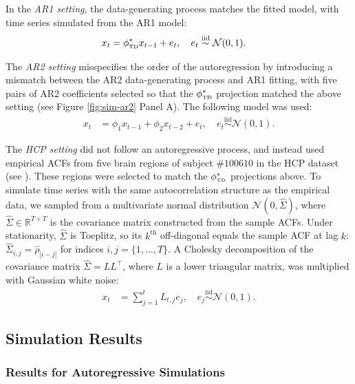 \documentclass[docs/main.tex]{subfiles}
\begin{document}
In the \textit{AR1 setting}, the data-generating process matches the fitted model, with time series simulated from the AR1 model:
\begin{align}\label{eq:sim-td-ar1}
    x_t &= \phi_{\scriptscriptstyle\text{TD}}^* x_{t-1} + e_t, \quad e_t \overset{\text{iid}}{\sim} \mathcal{N}(0, 1).
\end{align}

The \textit{AR2 setting} misspecifies the order of the autoregression by introducing a mismatch between the AR2 data-generating process and AR1 fitting,  with five pairs of AR2 coefficients selected so that the $\phi_{\scriptscriptstyle\text{TD}}^*$ projection matched the above setting (see Figure \ref{fig:sim-ar2} Panel A). The following model was used:
\begin{align}\label{eq:sim-td-ar2}
    x_t &= \phi_1 x_{t-1} + \phi_2 x_{t-2} + e_t, \quad e_t \overset{\text{iid}}{\sim} \mathcal{N}(0, 1).
\end{align}

The \textit{HCP setting} did not follow an autoregressive process, and instead used empirical ACFs from five brain regions of subject $\#100610$ in the HCP dataset (see ). These regions were selected to match the $\phi_{\scriptscriptstyle\text{TD}}^*$ projections above. To simulate time series with the same autocorrelation structure as the empirical data, we sampled from a multivariate normal distribution $\mathcal{N}(0, \hat\Sigma)$, where $\hat\Sigma \in \mathbb{R}^{T\times T}$ is the covariance matrix constructed from the sample ACFs. Under stationarity, $\hat\Sigma$ is Toeplitz, so its $k^\text{th}$ off-diagonal equals the sample ACF at lag $k$: $\hat\Sigma_{i,j} = \hat\rho_{|i-j|}$ for indices $i,j=\{1, \dots, T\}$. A Cholesky decomposition of the covariance matrix $\hat\Sigma = LL^{\top}$, where $L$ is a lower triangular matrix, was multiplied with Gaussian white noise:
\begin{align}\label{eq:sim-td-hcp}
    x_t &= \sum_{j=1}^t L_{t,j} e_j, \quad e_j \overset{\text{iid}}{\sim} \mathcal{N}(0, 1).
\end{align}

\subsection{Simulation Results}

\subsubsection{Results for Autoregressive Simulations}
\end{document}
